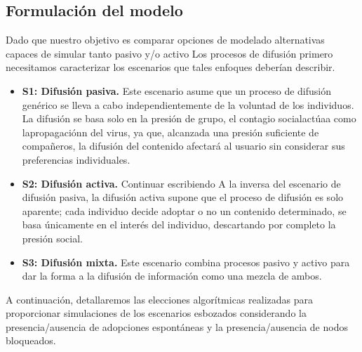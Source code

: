 \documentclass{article}
\begin{document}
\subsection{Formulación del modelo}
Dado que nuestro objetivo es comparar opciones de modelado alternativas capaces de simular tanto pasivo y/o activo Los procesos de difusión primero necesitamos caracterizar los escenarios que tales enfoques deberían describir.
\begin{itemize}
	\item \textbf{S1: Difusión pasiva.} Este escenario asume que un proceso de difusión genérico se lleva a cabo independientemente de la voluntad de los individuos. La difusión se basa solo en la presión de grupo, el contagio socialactúaa como lapropagaciónn del virus, ya que, alcanzada una presión suficiente de compañeros, la difusión del contenido afectará al usuario sin considerar sus preferencias individuales.
	\item \textbf{S2: Difusión activa.} 
	Continuar escribiendo
	A la inversa del escenario de difusión pasiva, la difusión activa supone que el proceso de difusión es solo aparente; cada individuo decide adoptar o no un contenido determinado, se basa únicamente en el interés del individuo, descartando por completo la presión social.
	\item \textbf{S3: Difusión mixta.} Este escenario combina procesos pasivo y activo para dar la forma a la difusión de información como una mezcla de ambos.
\end{itemize}
A continuación, detallaremos las elecciones algorítmicas realizadas para proporcionar simulaciones de los escenarios esbozados considerando la presencia/ausencia de adopciones espontáneas y la presencia/ausencia de nodos bloqueados.	
\end{document}
